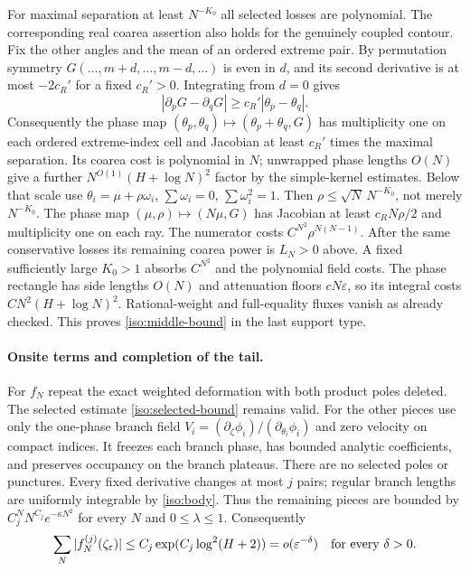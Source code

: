 \documentclass[11pt]{article}
\numberwithin{equation}{section}
\theoremstyle{definition}
\newcommand{\eps}{\varepsilon}
\begin{document}
For maximal separation at least $N^{-K_0}$ all selected losses are
polynomial. The corresponding real coarea assertion also holds for
the genuinely coupled contour. Fix the other angles and the mean of
an ordered extreme pair. By permutation symmetry
\(G(\ldots,m+d,\ldots,m-d,\ldots)\) is even in \(d\), and
its second derivative is at most \(-2c_R'\) for a fixed
\(c_R'>0\). Integrating from \(d=0\) gives
\[
 |\partial_pG-\partial_qG|
       \ge c_R'|\theta_p-\theta_q|.
\]
Consequently the phase map \((\theta_p,\theta_q)\mapsto
(\theta_p+\theta_q,G)\) has multiplicity one on each ordered
extreme-index cell and Jacobian at least \(c_R'\) times the maximal
separation. Its coarea cost is polynomial in \(N\); unwrapped
phase lengths \(O(N)\) give a further
\(N^{O(1)}(H+\log N)^2\) factor by the simple-kernel estimates.
Below that scale use $\theta_i=\mu+\rho\omega_i$,
$\sum\omega_i=0$, $\sum\omega_i^2=1$.
Then $\rho\le\sqrt N\,N^{-K_0}$, not merely $N^{-K_0}$.
The phase map $(\mu,\rho)\mapsto(N\mu,G)$ has Jacobian at least
$c_RN\rho/2$ and multiplicity one on each ray. The numerator costs
$C^{N^2}\rho^{N(N-1)}$. After the same conservative losses its
remaining coarea power is $L_N>0$ above. A fixed sufficiently large
$K_0>1$ absorbs $C^{N^2}$ and the polynomial field costs. The phase
rectangle has side lengths $O(N)$ and attenuation floors $cN\eps$,
so its integral costs $CN^2(H+\log N)^2$. Rational-weight and
full-equality fluxes vanish as already checked. This proves
\eqref{iso:middle-bound} in the last support type.

\paragraph{Onsite terms and completion of the tail.}
For $f_N$ repeat the exact weighted deformation with both product poles
deleted. The selected estimate \eqref{iso:selected-bound} remains
valid. For the other pieces use only the one-phase branch field
$V_i=(\partial_\zeta\phi_i)/(\partial_{\theta_i}\phi_i)$ and zero
velocity on compact indices. It freezes each branch phase, has bounded
analytic coefficients, and preserves occupancy on the branch plateaus.
There are no selected poles or punctures. Every fixed derivative changes
at most $j$ pairs; regular branch lengths are uniformly integrable by
\eqref{iso:body}. Thus the remaining pieces are bounded by
$C_j^NN^{C_j}e^{-\kappa N^2}$ for every $N$ and
$0\le\lambda\le1$. Consequently
\begin{equation}
 \sum_N|f_N^{(j)}(\zeta_\eps)|
 \le C_j\exp(C_j\log^2(H+2))=o(\eps^{-\delta})
 \quad\hbox{for every }\delta>0.
 \label{iso:onsite-bound}
\end{equation}
\end{document}
